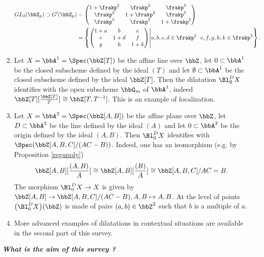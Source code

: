\documentclass[10pt]{alggeom}
\theoremstyle{definition}
\numberwithin{equation}{section}
\begin{document}
\begin{enumerate}
 \begin{align*}  GL_3 (\bbZ _p)  \supset G' ( \bbZ _p ) &= \begin{pmatrix} 1+ \frakp^2 & \frakp ^2 & \frakp ^5 \\ \frakp^2 & 1+ \frakp^2 & \frakp ^5 \\ \frakp^5 & \frakp^5 & 1+ \frakp^5 \end{pmatrix} \\ &= \left\{\begin{pmatrix} 1+ a & b & e\\ c & 1+ d & f \\ g & h & 1+ k \end{pmatrix} \middle| a, b , c, d \in \frakp ^{2} ~~ e,f,g,h,k \in \frakp ^5  \right\} . \end{align*}
 
 
 
 
\item Let $X = \bbA^1 = \Spec (\bbZ [T])$ be the affine line over $\bbZ$, let $0 \subset \bbA^1 $ be the closed subscheme defined by the ideal $(T)$ and let $\emptyset \subset \bbA ^1$ be the closed subscheme defined by the ideal $\bbZ[T]$. Then the dilatation $\Bl _{\emptyset} ^{D} X$ identifies with the open subscheme $\bbG _m$ of $\bbA^1$, indeed $\bbZ [T] [\frac{\bbZ[T]}{T}] \cong \bbZ [T , T^{-1}]$. This is an example of localization.

\item Let $X = \bbA ^2 = \Spec ( \bbZ [A,B]) $ be the affine plane over $\bbZ$, let $D\subset \bbA ^2$ be the line defined by the ideal $(A)$ and let $0\subset \bbA^2$ be the origin defined by the ideal $(A,B)$. Then $\Bl  ^{D}_{0}  X$ identifies with $\Spec (\bbZ [A,B,C]/(AC-B))$. Indeed, one has an isomorphism (e.g. by Proposition \ref{regupoly})
\[\bbZ[A,B][\frac{(A,B)}{A}]\cong \bbZ[A,B][\frac{(B)}{A}]  \cong \bbZ[A,B,C]/AC=B .\] The morphism $\Bl _0 ^D X \to X $ is given by  
$\bbZ [A,B] \to \bbZ [A,B,C]/(AC-B) , A,B \mapsto A,B $. At the level of points $\big(\Bl _0 ^D X \big)(\bbZ )$ is made of pairs $(a,b) \in \bbZ ^2$ such that $b$ is a multiple of $a.$

\item More advanced examples of dilatations in contextual situations are available in the second part of this survey.
\end{enumerate}

 

\begin{center}
\textbf{\textit{{What is the aim of this survey ? }}}
\end{center}
\end{document}
